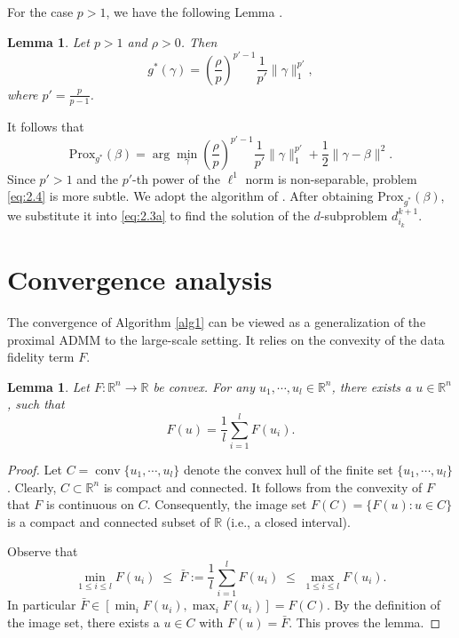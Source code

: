 \documentclass{article}
\newtheorem{lemma}[theorem]{Lemma}
\theoremstyle{definition}
\begin{document}
For the case $p>1$, we have the following Lemma \cite[Lemma 5.1]{shi2025hypergraph}.
\begin{lemma}
    Let $p>1$ and $\rho>0$. Then
    \begin{equation*}
      g^*(\gamma)
      =\left(\frac{\rho}{p}\right)^{p'-1}\frac{1}{p'}\|\gamma\|_1^{p'},
    \end{equation*}
    where $p'=\frac{p}{p-1}$.
\end{lemma}
It follows that
\begin{equation}\label{eq:2.4}
  \mbox{Prox}_{g^*}
  \left(\beta\right)
  =\arg\min_\gamma\left(\frac{\rho}{p}\right)^{p'-1}\frac{1}{p'}\|\gamma\|_1^{p'}
  +\frac{1}{2}\|\gamma-\beta\|^2.
\end{equation}
Since $p'>1$ and the $p'$-th power of the $\ell^1$ norm is non-separable, problem \eqref{eq:2.4} is more subtle.
We adopt the algorithm of \cite{prater2023constructive}.
After obtaining $\mbox{Prox}_{g^*}(\beta)$, we substitute it into \eqref{eq:2.3a} to find the solution of the $d$-subproblem $d_{i_k}^{k+1}$.



\section{Convergence analysis}
The convergence of Algorithm \ref{alg1} can be viewed as a generalization of the proximal ADMM \cite{zhang2011unified} to the large-scale setting.
It relies on the convexity of the data fidelity term $F$.

\begin{lemma}\label{le:convex}
Let $F:\mathbb{R}^n\rightarrow \mathbb{R}$ be convex. For any $u_1,\cdots, u_l\in\mathbb{R}^n$, there exists a $u\in \mathbb{R}^n$, such that
\begin{equation*}
  F(u)=\frac{1}{l}\sum_{i=1}^l F(u_i).
\end{equation*}
\end{lemma}
\begin{proof}
Let $C=\operatorname{conv}\{u_1,\cdots, u_l\}$ denote the convex hull of the finite set
$\{u_1,\cdots, u_l\}$. Clearly, $C\subset\mathbb{R}^n$ is compact and connected.
It follows from the convexity of $F$ that $F$ is continuous on $C$.
Consequently, the image set $F(C)=\{F(u): u\in C\}$ is a compact and connected subset
of $\mathbb{R}$ (i.e., a closed interval).


Observe that
\[
\min_{1\le i\le l} F(u_i)\;\le\;\bar F:=\frac{1}{l}\sum_{i=1}^l F(u_i) \;\le\;\max_{1\le i\le l} F(u_i).
\]
In particular $\bar F\in [\min_i F(u_i),\max_i F(u_i)]= F(C)$.
By the definition of the image set, there exists a $u\in C$ with
$F(u)=\bar F$. This proves the lemma.
\end{proof}
\end{document}
